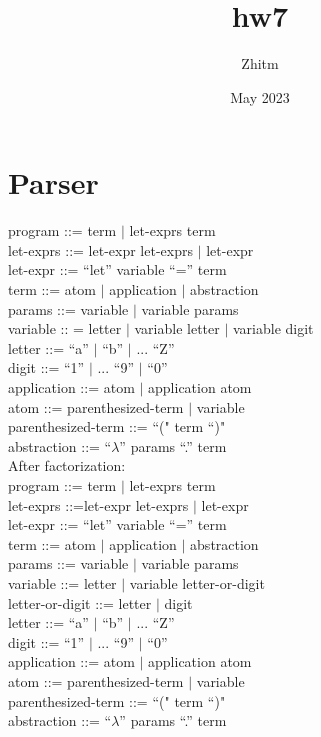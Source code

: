 \documentclass{article}
\title{hw7}
\author{Zhitm}
\date{May 2023}
\begin{document}
\maketitle

\section{Parser}

program ::= term $\vert$ let-exprs term\\
let-exprs ::= let-expr let-exprs $\vert$ let-expr\\
let-expr ::= ``let'' variable ``='' term\\
term ::= atom $\vert$ application $\vert$ abstraction \\
params ::= variable $\vert$ variable params\\
variable :: = letter $\vert$ variable letter $\vert$ variable digit\\
letter ::= ``a'' $\vert$ ``b'' $\vert$ ... ``Z''\\
digit ::= ``1'' $\vert$ ... ``9'' $\vert$ ``0''\\
application ::= atom $\vert$ application atom\\
atom ::= parenthesized-term $\vert$ variable\\
parenthesized-term ::= ``(" term ``)"\\
abstraction ::= ``$\lambda$'' params ``.'' term\\

After factorization:\\




program ::= term $\vert$ let-exprs term\\
let-exprs ::=let-expr let-exprs $\vert$ let-expr\\
let-expr ::= ``let'' variable ``='' term\\
term ::= atom $\vert$ application $\vert$ abstraction \\
params ::= variable $\vert$ variable params\\
variable ::= letter $\vert$ variable letter-or-digit\\
letter-or-digit ::= letter $\vert$ digit\\letter ::= ``a'' $\vert$ ``b'' $\vert$ ... ``Z''\\
digit ::= ``1'' $\vert$ ... ``9'' $\vert$ ``0''\\
application ::= atom $\vert$ application atom\\
atom ::= parenthesized-term $\vert$ variable\\
parenthesized-term ::= ``(" term ``)"\\
abstraction ::= ``$\lambda$'' params ``.'' term\\
\end{document}

